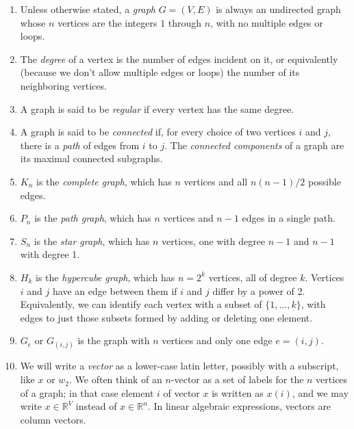 \documentclass[11pt]{article}
\newcommand{\Real}{\mathbb{R}}      %
\begin{document}
\begin{enumerate}

\item
Unless otherwise stated, a {\em graph} $G = (V,E)$ is always 
an undirected graph whose $n$ vertices are the integers 
$1$ through $n$, with no multiple edges or loops.

\item
The {\em degree} of a vertex is the number of edges incident on it, 
or equivalently (because we don't allow multiple edges or loops)
the number of its neighboring vertices.

\item 
A graph is said to be {\em regular} if every vertex has the same degree.

\item
A graph is said to be {\em connected} if, for every choice of two
vertices $i$ and $j$, there is a {\em path} of edges from $i$ to $j$.
The {\em connected components} of a graph are its maximal connected
subgraphs.

\item
$K_n$ is the {\em complete graph}, which has $n$ vertices and all $n(n-1)/2$ possible edges.

\item
$P_n$ is the {\em path graph}, which has $n$ vertices and $n-1$ edges in a single path.

\item
$S_n$ is the {\em star graph}, which has $n$ vertices, one with degree $n-1$ and 
$n-1$ with degree 1.

\item
$H_k$ is the {\em hypercube graph}, which has $n=2^k$ vertices, all of degree $k$.
Vertices $i$ and $j$ have an edge between them if $i$ and $j$ differ by a power of 2.
Equivalently, we can identify each vertex with a subset of $\{1,\ldots,k\}$,
with edges to just those subsets formed by adding or deleting one element.

\item
$G_e$ or $G_{(i,j)}$ is the graph with $n$ vertices and only one edge $e = (i,j)$.

\item
We will write a {\em vector} as a lower-case latin letter, 
possibly with a subscript, like $x$ or $w_2$.  
We often think of an $n$-vector as a set of labels for the
$n$ vertices of a graph; 
in that case element $i$ of vector $x$ is written as $x(i)$,
and we may write $x\in\Real^V$ instead of $x\in\Real^n$.
In linear algebraic expressions, vectors are column vectors.


\end{enumerate}
\end{document}
